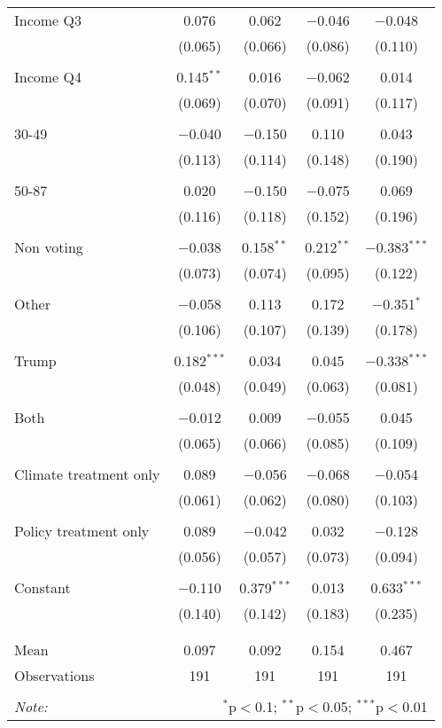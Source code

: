 \begin{tabular}{@{\extracolsep{5pt}}lcccc}
 Income Q3 & 0.076 & 0.062 & $-$0.046 & $-$0.048 \\ 
  & (0.065) & (0.066) & (0.086) & (0.110) \\ 
  & & & & \\ 
 Income Q4 & 0.145$^{**}$ & 0.016 & $-$0.062 & 0.014 \\ 
  & (0.069) & (0.070) & (0.091) & (0.117) \\ 
  & & & & \\ 
 30-49 & $-$0.040 & $-$0.150 & 0.110 & 0.043 \\ 
  & (0.113) & (0.114) & (0.148) & (0.190) \\ 
  & & & & \\ 
 50-87 & 0.020 & $-$0.150 & $-$0.075 & 0.069 \\ 
  & (0.116) & (0.118) & (0.152) & (0.196) \\ 
  & & & & \\ 
 Non voting & $-$0.038 & 0.158$^{**}$ & 0.212$^{**}$ & $-$0.383$^{***}$ \\ 
  & (0.073) & (0.074) & (0.095) & (0.122) \\ 
  & & & & \\ 
 Other & $-$0.058 & 0.113 & 0.172 & $-$0.351$^{*}$ \\ 
  & (0.106) & (0.107) & (0.139) & (0.178) \\ 
  & & & & \\ 
 Trump & 0.182$^{***}$ & 0.034 & 0.045 & $-$0.338$^{***}$ \\ 
  & (0.048) & (0.049) & (0.063) & (0.081) \\ 
  & & & & \\ 
 Both & $-$0.012 & 0.009 & $-$0.055 & 0.045 \\ 
  & (0.065) & (0.066) & (0.085) & (0.109) \\ 
  & & & & \\ 
 Climate treatment only & 0.089 & $-$0.056 & $-$0.068 & $-$0.054 \\ 
  & (0.061) & (0.062) & (0.080) & (0.103) \\ 
  & & & & \\ 
 Policy treatment only & 0.089 & $-$0.042 & 0.032 & $-$0.128 \\ 
  & (0.056) & (0.057) & (0.073) & (0.094) \\ 
  & & & & \\ 
 Constant & $-$0.110 & 0.379$^{***}$ & 0.013 & 0.633$^{***}$ \\ 
  & (0.140) & (0.142) & (0.183) & (0.235) \\ 
  & & & & \\ 
\hline \\[-1.8ex] 
Mean & 0.097 & 0.092 & 0.154 & 0.467 \\ 
Observations & 191 & 191 & 191 & 191 \\ 
\hline 
\hline \\[-1.8ex] 
\textit{Note:}  & \multicolumn{4}{r}{$^{*}$p$<$0.1; $^{**}$p$<$0.05; $^{***}$p$<$0.01} \\ 
\end{tabular} 
